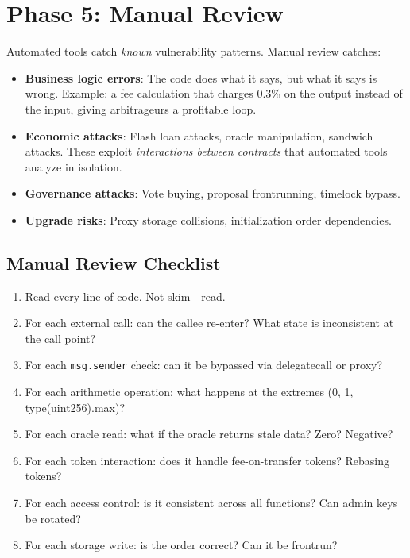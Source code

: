 \section{Phase 5: Manual Review}


Automated tools catch \emph{known} vulnerability patterns. Manual review catches:

\begin{itemize}[nosep]
  \item \textbf{Business logic errors}: The code does what it says, but what it says is
    wrong. Example: a fee calculation that charges 0.3\% on the output instead of the
    input, giving arbitrageurs a profitable loop.
  \item \textbf{Economic attacks}: Flash loan attacks, oracle manipulation, sandwich
    attacks. These exploit \emph{interactions between contracts} that automated tools
    analyze in isolation.
  \item \textbf{Governance attacks}: Vote buying, proposal frontrunning, timelock bypass.
  \item \textbf{Upgrade risks}: Proxy storage collisions, initialization order dependencies.
\end{itemize}

\subsection{Manual Review Checklist}

\begin{enumerate}[nosep]
  \item Read every line of code. Not skim---read.
  \item For each external call: can the callee re-enter? What state is inconsistent at the call point?
  \item For each \texttt{msg.sender} check: can it be bypassed via delegatecall or proxy?
  \item For each arithmetic operation: what happens at the extremes (0, 1, type(uint256).max)?
  \item For each oracle read: what if the oracle returns stale data? Zero? Negative?
  \item For each token interaction: does it handle fee-on-transfer tokens? Rebasing tokens?
  \item For each access control: is it consistent across all functions? Can admin keys be rotated?
  \item For each storage write: is the order correct? Can it be frontrun?
\end{enumerate}

